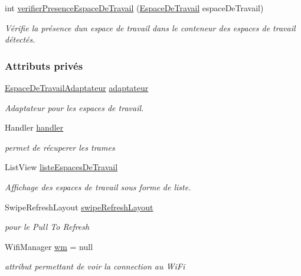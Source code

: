 \begin{DoxyCompactItemize}
int \hyperlink{classcom_1_1lasalle_1_1meeting_1_1_i_h_m_meeting_a402dc23f375fae1f1faa3d5728cdad00}{verifier\+Presence\+Espace\+De\+Travail} (\hyperlink{classcom_1_1lasalle_1_1meeting_1_1_espace_de_travail}{Espace\+De\+Travail} espace\+De\+Travail)
\begin{DoxyCompactList}\small\item\em Vérifie la présence d\textquotesingle{}un espace de travail dans le conteneur des espaces de travail détectés. \end{DoxyCompactList}\end{DoxyCompactItemize}
\subsubsection*{Attributs privés}
\begin{DoxyCompactItemize}
\item 
\hyperlink{classcom_1_1lasalle_1_1meeting_1_1_espace_de_travail_adaptateur}{Espace\+De\+Travail\+Adaptateur} \hyperlink{classcom_1_1lasalle_1_1meeting_1_1_i_h_m_meeting_ac103010077163ba43b830ffe524f476d}{adaptateur}
\begin{DoxyCompactList}\small\item\em Adaptateur pour les espaces de travail. \end{DoxyCompactList}\item 
Handler \hyperlink{classcom_1_1lasalle_1_1meeting_1_1_i_h_m_meeting_af0a341dd3f520bba9d94b4b083ff75af}{handler}
\begin{DoxyCompactList}\small\item\em permet de récuperer les trames \end{DoxyCompactList}\item 
List\+View \hyperlink{classcom_1_1lasalle_1_1meeting_1_1_i_h_m_meeting_ae32ea3420cbe17af0b32df447e326427}{liste\+Espaces\+De\+Travail}
\begin{DoxyCompactList}\small\item\em Affichage des espaces de travail sous forme de liste. \end{DoxyCompactList}\item 
Swipe\+Refresh\+Layout \hyperlink{classcom_1_1lasalle_1_1meeting_1_1_i_h_m_meeting_a64f84fda5f7f595cf0c75ccfb189af8d}{swipe\+Refresh\+Layout}
\begin{DoxyCompactList}\small\item\em pour le Pull To Refresh \end{DoxyCompactList}\item 
Wifi\+Manager \hyperlink{classcom_1_1lasalle_1_1meeting_1_1_i_h_m_meeting_acdbac7f6ea8e7a8ed99e0ceaaf0f9f97}{wm} = null
\begin{DoxyCompactList}\small\item\em attribut permettant de voir la connection au Wi\+Fi \end{DoxyCompactList}\end{DoxyCompactItemize}
